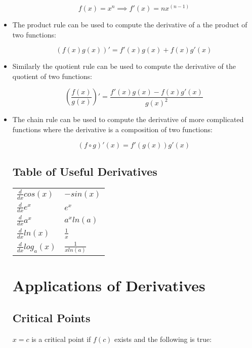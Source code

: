 \documentclass[8pt]{extarticle}
\begin{document}
\begin{multicols}{2}
\begin{itemize}
	\begin{equation}
		f(x) = x^n \implies f'(x) = nx^{(n-1)}
	\end{equation}
	
	\item The product rule can be used to compute the derivative of a the product of two functions:
	
	\begin{equation}
		(f(x)g(x))' = f'(x)g(x) + f(x)g'(x)
	\end{equation}
	
	\item Similarly the quotient rule can be used to compute the derivative of the quotient of two functions:
	
	\begin{equation}
		\left(\frac{f(x)}{g(x)}\right)' = \frac{f'(x)g(x) - f(x)g'(x)}{g(x)^2}
	\end{equation}
	
	\item The chain rule can be used to compute the derivative of more complicated functions where the derivative is a composition of two functions:
	
	\begin{equation}
		(f \circ g)'(x) = f'(g(x))g'(x)
	\end{equation}
	
\subsection{Table of Useful Derivatives}

\begin{table}[H]
\centering
\label{my-label}
\begin{tabular}{l | l}
 $\frac{d}{dx} cos(x)$ &  $-sin(x)$ \\
 $\frac{d}{dx} e^x$ &  $e^x$ \\
 $\frac{d}{dx} a^x$ &  $a^xln(a)$ \\
 $\frac{d}{dx} ln(x)$ &  $\frac{1}{x}$ \\
 $\frac{d}{dx} log_a(x)$ &  $\frac{1}{x ln(a)}$ \\
\end{tabular}
\end{table}

\section{Applications of Derivatives}
\subsection{Critical Points}
$x=c$ is a critical point if $f(c)$ exists and the following is true:


\end{itemize}
\end{multicols}
\end{document}
